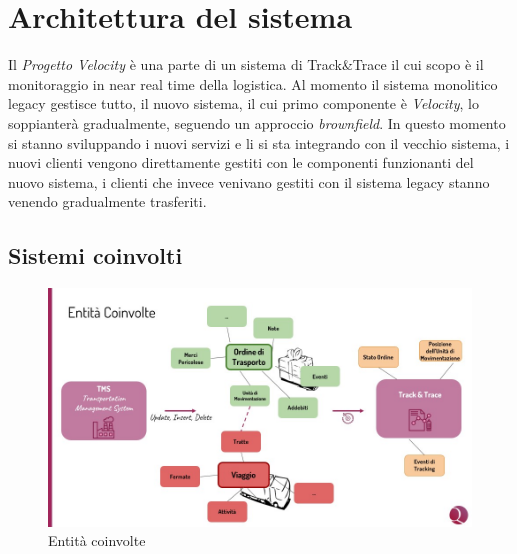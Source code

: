 \chapter{Architettura del sistema}
\label{ch:architecture}
Il \textit{Progetto Velocity} è una parte di un sistema di Track\&Trace il cui scopo è il monitoraggio in near real time della logistica.
Al momento il sistema monolitico legacy gestisce tutto, il nuovo sistema, il cui primo componente è \textit{Velocity}, lo soppianterà gradualmente, seguendo un approccio \textit{brownfield}.
In questo momento si stanno sviluppando i nuovi servizi e li si sta integrando con il vecchio sistema, i nuovi clienti vengono direttamente gestiti con le componenti
funzionanti del nuovo sistema, i clienti che invece venivano gestiti con il sistema legacy stanno venendo gradualmente trasferiti.

\section{Sistemi coinvolti}
\label{sec:architecture_entity}

\begin{figure}[H]
\centering
    \includegraphics[width=\textwidth]{images/architecture/entita_coinvolte.jpg}
    \caption{Entità coinvolte}
    \label{fig:architecture_entities_img}
\end{figure}

